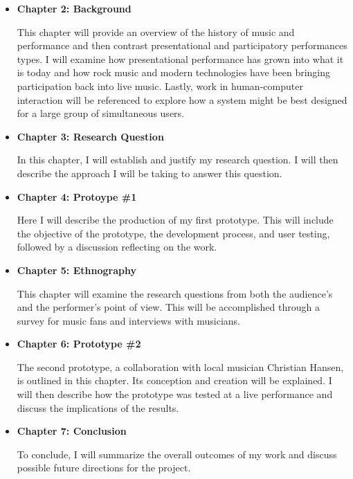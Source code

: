 \begin{itemize}
	\item \textbf{Chapter 2: Background}
	
	This chapter will provide an overview of the history of music and performance and then contrast presentational and participatory performances types. I will examine how presentational performance has grown into what it is today and how rock music and modern technologies have been bringing participation back into live music. Lastly, work in human-computer interaction will be referenced to explore how a system might be best designed for a large group of simultaneous users.
			
	\item \textbf{Chapter 3: Research Question}
	
	In this chapter, I will establish and justify my research question. I will then describe the approach I will be taking to answer this question.
	
	\item \textbf{Chapter 4: Protoype \#1}
	
	Here I will describe the production of my first prototype. This will include the objective of the prototype, the development process, and user testing, followed by a discussion reflecting on the work.
		
	\item \textbf{Chapter 5: Ethnography}
	
	This chapter will examine the research questions from both the audience's and the performer's point of view. This will be accomplished through a survey for music fans and interviews with musicians.
		
	\item \textbf{Chapter 6: Prototype \#2}
	
	The second prototype, a collaboration with local musician Christian Hansen, is outlined in this chapter. Its conception and creation will be explained. I will then describe how the prototype was tested at a live performance and discuss the implications of the results.
		
	\item \textbf{Chapter 7: Conclusion}
	
	To conclude, I will summarize the overall outcomes of my work and discuss possible future directions for the project.
\end{itemize}